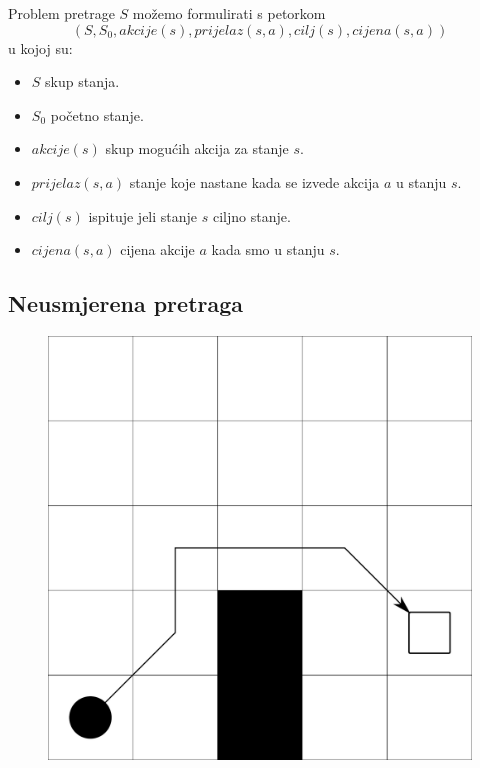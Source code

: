 \documentclass[times, utf8, zavrsni, numeric]{fer}
\begin{document}
\par Problem pretrage \(S\) možemo formulirati s petorkom
\[(S, S_0, akcije(s), prijelaz(s, a), cilj(s), cijena(s, a))\]
u kojoj su:
\begin{itemize}
    \item \(S\) skup stanja.
    \item \(S_0\) početno stanje.
    \item \(akcije(s)\) skup mogućih akcija za stanje \(s\).
    \item \(prijelaz(s, a)\) stanje koje nastane kada se izvede akcija \(a\) u stanju \(s\).
    \item \(cilj(s)\) ispituje jeli stanje \(s\) ciljno stanje.
    \item \(cijena(s, a)\) cijena akcije \(a\) kada smo u stanju \(s\). 
\end{itemize}

\subsection{Neusmjerena pretraga}

\begin{figure}[h] 
	\centering
	\includegraphics[width=0.3\linewidth]{images/basicGrid.pdf}
	\caption{}
	\label{fig:basicGrid}
\end{figure} 
\end{document}
